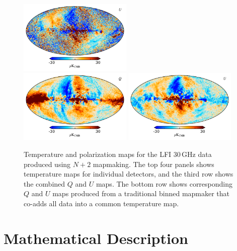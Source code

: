 \documentclass{aa}
\begin{document}
\begin{figure}[p]
  \includegraphics[width=0.48\textwidth]{figs/map_U_badpol.pdf}\\
  \includegraphics[width=0.48\textwidth]{figs/map_Q_binned.pdf}
  \includegraphics[width=0.48\textwidth]{figs/map_U_binned.pdf}\\
  \caption{Temperature and polarization maps for the LFI 30\,GHz data produced using $N+2$ mapmaking. The top four panels shows temperature maps for individual detectors, and the third row shows the combined $Q$ and $U$ maps. The bottom row shows corresponding $Q$ and $U$ maps produced from a traditional binned mapmaker that co-adds all data into a common temperature map.}
  \label{fig:maps}
\end{figure}


\section{Mathematical Description}
\label{sec:mapmaking}
\end{document}
